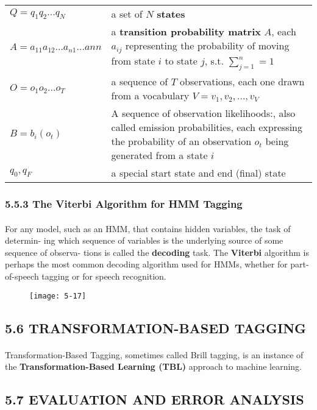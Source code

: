\documentclass{article}
\begin{document}
		\begin{tabular}{lp{7cm}}
			$Q=q_1q_2...q_N$ & a set of $N$ \textbf{states} \\
			$A=a_{11}a_{12}...a_{n1}...a{nn}$ & a \textbf{transition probability matrix} $A$, each $a_{ij}$ representing the probability of moving from state $i$ to state $j$, s.t. $\sum_{j=1}^{n} = 1$ \\
			$O=o_1o_2...o_T$ & a sequence of $T$ observations, each one drawn from a vocabulary $V = v_1,v_2,...,v_V$ \\
			$B=b_i(o_t)$ & A sequence of observation likelihoods:, also called emission probabilities, each expressing the probability of an observation $o_t$ being generated from a state $i$ \\
			$q_0,q_F$ & a special start state and end (final) state \\
		\end{tabular}
	
		\subsubsection*{5.5.3 The Viterbi Algorithm for HMM Tagging}
		
		\paragraph{}
		For any model, such as an HMM, that contains hidden variables, the task of determin- ing which sequence of variables is the underlying source of some sequence of observa- tions is called the \textbf{decoding} task. The \textbf{Viterbi} algorithm is perhaps the most common decoding algorithm used for HMMs, whether for part-of-speech tagging or for speech recognition.
		
		\begin{figure}
			\centering
			\texttt{[image: 5-17]}
		\end{figure}
	
	\subsection*{5.6 TRANSFORMATION-BASED TAGGING}
	
	\paragraph{}
	Transformation-Based Tagging, sometimes called Brill tagging, is an instance of the \textbf{Transformation-Based Learning (TBL)} approach to machine learning.
	
	\subsection*{5.7 EVALUATION AND ERROR ANALYSIS}
	
	\paragraph{}
	
	
	
		
		
	
		
		
		
	
	
	
	
\end{document}

